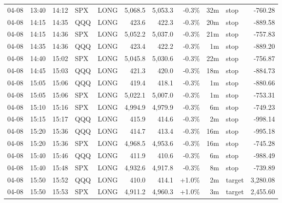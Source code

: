 \documentclass[11pt,a4paper,twoside]{article}
\begin{document}
\begin{center}
\begin{longtable}{>{\color{txtmain}}l l l l l r r r r >{\color{txtmain}}l r}
04-08 & 13:40 & 14:12 & SPX & LONG & 5,068.5 & 5,053.3 & \textcolor{lossred}{-0.3\%} & 32m & stop & \textcolor{lossred}{-760.28} \\
04-08 & 14:15 & 14:35 & QQQ & LONG & 423.6 & 422.3 & \textcolor{lossred}{-0.3\%} & 20m & stop & \textcolor{lossred}{-889.58} \\
04-08 & 14:15 & 14:36 & SPX & LONG & 5,052.2 & 5,037.0 & \textcolor{lossred}{-0.3\%} & 21m & stop & \textcolor{lossred}{-757.83} \\
04-08 & 14:35 & 14:36 & QQQ & LONG & 423.4 & 422.2 & \textcolor{lossred}{-0.3\%} & 1m & stop & \textcolor{lossred}{-889.20} \\
04-08 & 14:40 & 15:02 & SPX & LONG & 5,045.8 & 5,030.6 & \textcolor{lossred}{-0.3\%} & 22m & stop & \textcolor{lossred}{-756.87} \\
04-08 & 14:45 & 15:03 & QQQ & LONG & 421.3 & 420.0 & \textcolor{lossred}{-0.3\%} & 18m & stop & \textcolor{lossred}{-884.73} \\
04-08 & 15:05 & 15:06 & QQQ & LONG & 419.4 & 418.1 & \textcolor{lossred}{-0.3\%} & 1m & stop & \textcolor{lossred}{-880.66} \\
04-08 & 15:05 & 15:06 & SPX & LONG & 5,022.1 & 5,007.0 & \textcolor{lossred}{-0.3\%} & 1m & stop & \textcolor{lossred}{-753.31} \\
04-08 & 15:10 & 15:16 & SPX & LONG & 4,994.9 & 4,979.9 & \textcolor{lossred}{-0.3\%} & 6m & stop & \textcolor{lossred}{-749.23} \\
04-08 & 15:15 & 15:17 & QQQ & LONG & 415.9 & 414.6 & \textcolor{lossred}{-0.3\%} & 2m & stop & \textcolor{lossred}{-998.14} \\
04-08 & 15:20 & 15:36 & QQQ & LONG & 414.7 & 413.4 & \textcolor{lossred}{-0.3\%} & 16m & stop & \textcolor{lossred}{-995.18} \\
04-08 & 15:20 & 15:36 & SPX & LONG & 4,968.5 & 4,953.6 & \textcolor{lossred}{-0.3\%} & 16m & stop & \textcolor{lossred}{-745.28} \\
04-08 & 15:40 & 15:46 & QQQ & LONG & 411.9 & 410.6 & \textcolor{lossred}{-0.3\%} & 6m & stop & \textcolor{lossred}{-988.49} \\
04-08 & 15:40 & 15:48 & SPX & LONG & 4,932.6 & 4,917.8 & \textcolor{lossred}{-0.3\%} & 8m & stop & \textcolor{lossred}{-739.89} \\
04-08 & 15:50 & 15:52 & QQQ & LONG & 410.0 & 414.1 & \textcolor{wingreen}{+1.0\%} & 2m & target & \textcolor{wingreen}{3,280.08} \\
04-08 & 15:50 & 15:53 & SPX & LONG & 4,911.2 & 4,960.3 & \textcolor{wingreen}{+1.0\%} & 3m & target & \textcolor{wingreen}{2,455.60} \\

\end{longtable}
\end{center}
\end{document}
